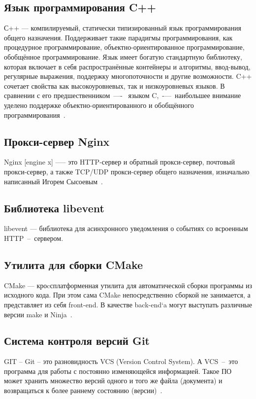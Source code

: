 \subsection{Язык программирования C++}
С++ --- компилируемый, статически типизированный язык программирования общего назначения.
Поддерживает такие парадигмы программирования, как процедурное программирование,
объектно-ориентированное программирование, обобщённое программирование.
Язык имеет богатую стандартную библиотеку, которая включает в себя
распространённые контейнеры и алгоритмы, ввод-вывод, регулярные выражения,
поддержку многопоточности и другие возможности. C++ сочетает свойства как
высокоуровневых, так и низкоуровневых языков. В сравнении с его предшественником~—-~
языком C,~-—~наибольшее внимание уделено поддержке объектно-ориентированного и
обобщённого программирования~\cite{cpp}.


\subsection{Прокси-сервер Nginx}
Nginx [engine x] —-- это HTTP-сервер и обратный прокси-сервер, почтовый
прокси-сервер, а также TCP/UDP прокси-сервер общего назначения, изначально
написанный Игорем Сысоевым~\cite{nginx}.

\subsection{Библиотека libevent}
libevent --- библиотека для асинхронного уведомления о событиях со всроенным
HTTP~--~сервером.

\subsection{Утилита для сборки CMake}

CMake — кроcсплатформенная утилита для автоматической сборки программы из
исходного кода. При этом сама CMake непосредственно сборкой не занимается,
а представляет из себя front-end. В качестве back-end`a могут выступать
различные версии make и Ninja~\cite{cmake}.

\subsection{Система контроля версий Git}
GIT – Git – это разновидность VCS (Version Control System).
А VCS~–~это программа для работы с постоянно изменяющейся информацией. Такое ПО
может хранить множество версий одного и того же файла (документа) и возвращаться
к более раннему состоянию (версии)~\cite{git}.

